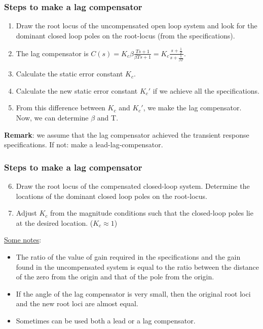 \begin{frame}
	\frametitle{Steps to make a lag compensator}
		\begin{enumerate}
			\item Draw the root locus of the uncompensated open loop system and look for the dominant closed loop poles on the root-locus (from the specifications).
			\item The lag compensator is $C(s)=K_c \beta\frac{Ts+1}{\beta Ts+1}= K_c\frac{s+\frac{1}{T}}{s+\frac{1}{\beta T}}$.
			\item Calculate the static error constant $K_c$. 
			\item Calculate the new static error constant $K_c'$ if we achieve all the specifications.
			\item From this difference between $K_c$ and $K_c'$, we make the lag compensator. Now, we can determine $\beta$ and T. 
		\end{enumerate}
		\textbf{Remark}: we assume that the lag compensator achieved the transient response specifications. If not: make a lead-lag-compensator.
\end{frame}

\begin{frame}
	\frametitle{Steps to make a lag compensator}
		\begin{enumerate}
			\setcounter{enumi}{5}
			\item Draw the root locus of the compensated closed-loop system. Determine the locations of the dominant closed loop poles on the root-locus. 
			\item Adjust $K_c$ from the magnitude conditions such that the closed-loop poles lie at the desired location. ($K_c\approx 1$)
		\end{enumerate}
		\vspace{3mm}
		
		\underline{Some notes}:
		\begin{itemize}
			\item The ratio of the value of gain required in the specifications and the gain found in the uncompensated system is equal to the ratio between the distance of the zero from the origin and that of the pole from the origin.
			\item If the angle of the lag compensator is very small, then the original root loci and the new root loci are almost equal.
			\item Sometimes can be used both a lead or a lag compensator. 
		\end{itemize}
\end{frame}

